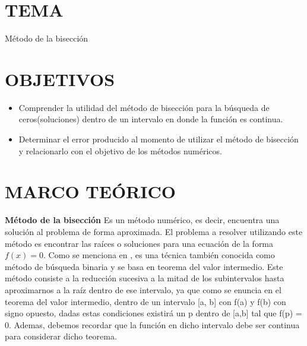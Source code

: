 \documentclass[12pt]{article}
\begin{document}
\section*{TEMA}
Método de la bisección

\vspace{0.5cm}

\section*{OBJETIVOS}
\begin{itemize}
    \item Comprender la utilidad del método de bisección para la búsqueda de ceros(soluciones) dentro de un intervalo en donde la función es continua.
    \item Determinar el error producido al momento de utilizar el método de bisección y relacionarlo con el objetivo de los métodos numéricos.
\end{itemize}

\vspace{0.5cm}

\section*{MARCO TEÓRICO}

\large\textbf{Método de la bisección}
\normalsize\newline\newline
Es un método numérico, es decir, encuentra una solución al problema de forma aproximada. El problema a resolver utilizando este método es encontrar las raíces o soluciones para una ecuación de la forma $f(x) = 0$.
Como se menciona en \cite{book:2608618}, es una técnica también conocida como método de búsqueda binaria y se basa en teorema del valor intermedio. Este método consiste a la reducción sucesiva a la mitad de los subintervalos hasta aproximarnos a la raíz dentro de ese intervalo, ya que como se enuncia en el teorema del valor intermedio, dentro de un intervalo [a, b] con f(a) y f(b) con signo opuesto, dadas estas condiciones existirá un p dentro de [a,b] tal que f(p) = 0. Ademas, debemos recordar que la función en dicho intervalo debe ser continua para considerar dicho teorema. 
\vspace{0.5cm}
\end{document}

